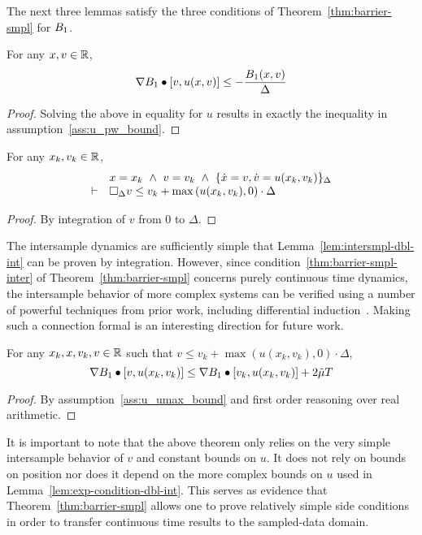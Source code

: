 The next three lemmas satisfy the three conditions of
Theorem~\ref{thm:barrier-smpl} for $B_1$.

\begin{lemma}
For any $x,v \in \mathbb{R}$,
\[
\nabla B_1 \bullet [v,u(x,v)] \leq -\frac{B_1 (x,v)}{\Delta}
\]
\label{lem:exp-condition-dbl-int}
\end{lemma}
\begin{proof}
Solving the above in equality for $u$ results in exactly the inequality in
assumption~\ref{ass:u_pw_bound}.
\end{proof}

\begin{lemma}
For any $x_k, v_k \in \mathbb{R}$,
\[
\begin{array}{cl}
& x = x_k~\wedge~v=v_k~\wedge~\{\dot{x}=v,\dot{v}=u(x_k,v_k)\}_{\Delta} \\
\vdash
& \Box{}_{\Delta} v \leq v_k + \max{(u(x_k,v_k), 0)}\cdot \Delta
\end{array}
\]
\label{lem:intersmpl-dbl-int}
\end{lemma}
\begin{proof}
By integration of $v$ from 0 to $\Delta$.
\end{proof}

The intersample dynamics are sufficiently simple that
Lemma~\ref{lem:intersmpl-dbl-int} can be proven by integration. However,
since condition~\eqref{thm:barrier-smpl-inter} of
Theorem~\ref{thm:barrier-smpl} concerns purely continuous time dynamics,
the intersample behavior of more complex systems can be verified using a
number of powerful techniques from prior work, including differential
induction~\cite{Platzer10DAL}. Making such a connection formal is an
interesting direction for future work.

\begin{lemma}
For any $x_k, x, v_k, v \in \mathbb{R}$ such that $v \leq v_k + \max{(u(x_k,v_k),
  0)}\cdot \Delta$,
\[
\nabla B_1 \bullet [v,u(x_k,v_k)] \leq \nabla B_1 \bullet [v_k,u(x_k,v_k)] + 2\tilde{\mu} T
\]
\label{lem:deriv-change-dbl-int}
\end{lemma}
\begin{proof}
By assumption~\ref{ass:u_umax_bound} and first order reasoning over real
arithmetic.
\end{proof}

It is important to note that the above theorem only relies on the very
simple intersample behavior of $v$ and constant bounds on $u$. It does not
rely on bounds on position nor does it depend on the more complex bounds on
$u$ used in Lemma~\ref{lem:exp-condition-dbl-int}. This serves as evidence
that Theorem~\ref{thm:barrier-smpl} allows one to prove relatively simple
side conditions in order to transfer continuous time results to the
sampled-data domain.


